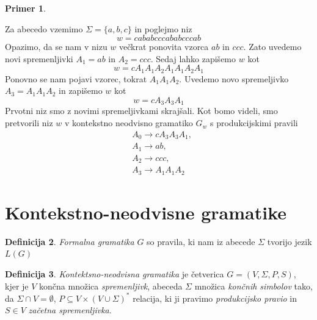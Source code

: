 \documentclass{amsart}
\theoremstyle{definition} %
\newtheorem{definicija}{Definicija}[section]
\newtheorem{primer}[definicija]{Primer}
\theoremstyle{plain} %
\begin{document}
\begin{primer}\label{Kompresija}
    
    Za abecedo vzemimo $ \Sigma = \{ a,b,c \} $ in poglejmo niz
    \[
        w = cababcccababcccab
    \]
    Opazimo, da se nam v nizu $ w $ večkrat ponovita vzorca $ ab $ in $ ccc $. Zato
    uvedemo novi spremenljivki $ A_1 = ab $ in $ A_2 = ccc $. Sedaj lahko zapišemo $ w $ kot
    \[
        w = cA_1A_1A_2A_1A_1A_2A_1
    \]
    Ponovno se nam pojavi vzorec, tokrat $ A_1A_1A_2 $. Uvedemo novo spremeljivko $ A_3 = A_1A_1A_2 $
    in zapišemo $ w $ kot
    \[
        w = cA_3A_3A_1
    \]
    Prvotni niz smo z novimi spremeljivkami skrajšali. Kot bomo videli, smo
    pretvorili niz $ w $ v kontekstno neodvisno gramatiko $ G_w $ s
    produkcijskimi pravili
    \begin{align*}
        & A_0  \rightarrow  cA_3A_3A_1, \\
        & A_1  \rightarrow  ab, \\
        & A_2  \rightarrow  ccc, \\
        & A_3  \rightarrow  A_1A_1A_2
    \end{align*}

\end{primer}

\section{Kontekstno-neodvisne gramatike}

\begin{definicija}

    \textit{Formalna gramatika} $ G $ so pravila, ki nam iz abecede $ \Sigma $ tvorijo jezik
    $ L(G) $

\end{definicija}

\begin{definicija}

    \textit{Kontektsno-neodvisna gramatika} je četverica $ G = ( V, \Sigma, P, S ) $, kjer je
    $ V $ končna množica \textit{spremenljivk}, abeceda $ \Sigma $ množica \textit{končnih simbolov} tako,
    da $ \Sigma \cap V = \emptyset $, $ P \subseteq V \times ( V \cup \Sigma )^* $ relacija, ki ji
    pravimo \textit{produkcijsko pravio} in $ S \in V $ \textit{začetna spremenljivka}.

\end{definicija}
\end{document}

